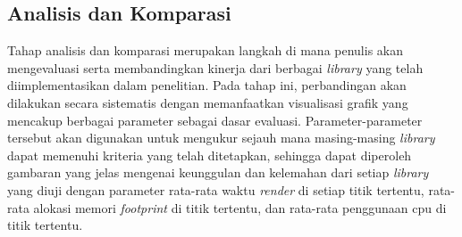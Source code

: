 \subsection{Analisis dan Komparasi}
Tahap analisis dan komparasi merupakan langkah di mana penulis akan mengevaluasi serta membandingkan kinerja dari berbagai \textit{library} yang telah diimplementasikan dalam penelitian. Pada tahap ini, perbandingan akan dilakukan secara sistematis dengan memanfaatkan visualisasi grafik yang mencakup berbagai parameter sebagai dasar evaluasi. Parameter-parameter tersebut akan digunakan untuk mengukur sejauh mana masing-masing \textit{library} dapat memenuhi kriteria yang telah ditetapkan, sehingga dapat diperoleh gambaran yang jelas mengenai keunggulan dan kelemahan dari setiap \textit{library} yang diuji dengan parameter rata-rata waktu \textit{render} di setiap titik tertentu, rata-rata alokasi memori \textit{footprint} di titik tertentu, dan rata-rata penggunaan cpu di titik tertentu.
